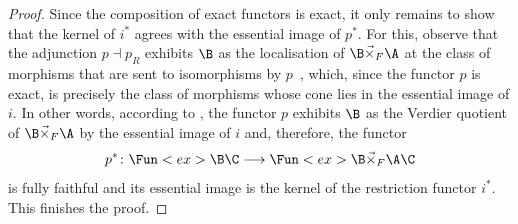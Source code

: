 \documentclass[a4paper]{amsart}
\begin{document}
\begin{proof}
  Since the composition of exact functors is exact, it only remains to show that
  the kernel of $i^*$ agrees with the essential image of $p^*$. For this,
  observe that the adjunction $p\dashv p_R$ exhibits $\B$ as the localisation of
  $\B\vec{\times}_F\A$ at the class of morphisms that are sent to isomorphisms
  by $p$~\cite[Proposition~5.2.7.12]{Lur09}, which, since the functor $p$ is
  exact, is precisely the class of morphisms whose cone lies in the essential
  image of $i$. In other words, according to ,
  the functor $p$ exhibits $\B$ as the Verdier quotient of $\B\vec{\times}_F\A$
  by the essential image of $i$ and, therefore, the functor
  \[
    p^*\colon\Fun<ex>{\B}{\C}\longrightarrow\Fun<ex>{\B\vec{\times}_F\A}{\C}
  \]
  is fully faithful and its essential image is the kernel of the restriction
  functor $i^*$. This finishes the proof.
\end{proof}
\end{document}
